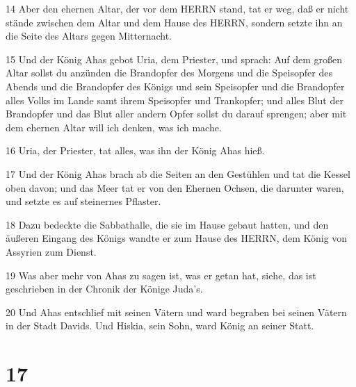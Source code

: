 \par 14 Aber den ehernen Altar, der vor dem HERRN stand, tat er weg, daß er nicht stände zwischen dem Altar und dem Hause des HERRN, sondern setzte ihn an die Seite des Altars gegen Mitternacht.
\par 15 Und der König Ahas gebot Uria, dem Priester, und sprach: Auf dem großen Altar sollst du anzünden die Brandopfer des Morgens und die Speisopfer des Abends und die Brandopfer des Königs und sein Speisopfer und die Brandopfer alles Volks im Lande samt ihrem Speisopfer und Trankopfer; und alles Blut der Brandopfer und das Blut aller andern Opfer sollst du darauf sprengen; aber mit dem ehernen Altar will ich denken, was ich mache.
\par 16 Uria, der Priester, tat alles, was ihn der König Ahas hieß.
\par 17 Und der König Ahas brach ab die Seiten an den Gestühlen und tat die Kessel oben davon; und das Meer tat er von den Ehernen Ochsen, die darunter waren, und setzte es auf steinernes Pflaster.
\par 18 Dazu bedeckte die Sabbathalle, die sie im Hause gebaut hatten, und den äußeren Eingang des Königs wandte er zum Hause des HERRN, dem König von Assyrien zum Dienst.
\par 19 Was aber mehr von Ahas zu sagen ist, was er getan hat, siehe, das ist geschrieben in der Chronik der Könige Juda's.
\par 20 Und Ahas entschlief mit seinen Vätern und ward begraben bei seinen Vätern in der Stadt Davids. Und Hiskia, sein Sohn, ward König an seiner Statt.

\chapter{17}

